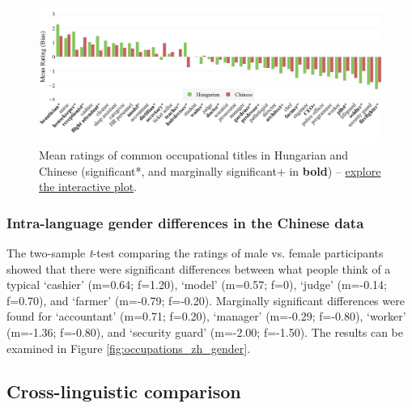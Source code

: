 \documentclass[11pt]{article}
\newcommand{\zh}[1]{\simplifiedchinesefont{#1}\rmfamily}
\begin{document}
\begin{figure}[!ht]
  \centering
  \includegraphics[width=\linewidth]{../occupations_comparison}
  \caption{Mean ratings of common occupational titles in Hungarian and Chinese (significant*, and marginally significant+ in \textbf{bold}) -- \href{https://htmlpreview.github.io/?https://github.com/partigabor/occupational-bias/blob/main/occupations_comparison.html}{explore the interactive plot}.}
  \label{fig:occupations_comparison}
\end{figure}

\subsubsection{Intra-language gender differences in the Chinese data}

The two-sample \textit{t}-test comparing the ratings of male vs. female participants showed that there were significant differences between what people think of a typical \zh{收银员} `cashier' (m=0.64; f=1.20), \zh{模特} `model' (m=0.57; f=0), \zh{法官} `judge' (m=-0.14; f=0.70), and \zh{农民} `farmer' (m=-0.79; f=-0.20). Marginally significant differences were found for \zh{会计} `accountant' (m=0.71; f=0.20), \zh{高管} `manager' (m=-0.29; f=-0.80), \zh{工人} `worker' (m=-1.36; f=-0.80), and \zh{保安} `security guard' (m=-2.00; f=-1.50). The results can be examined in Figure \ref{fig:occupations_zh_gender}.


\subsection{Cross-linguistic comparison}

\end{document}
